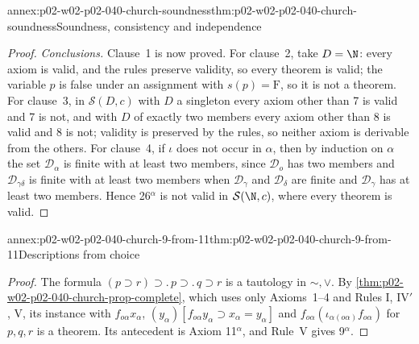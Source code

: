 \begin{annexitem}{annex:p02-w02-p02-040-church-soundness}{thm:p02-w02-p02-040-church-soundness}{Soundness, consistency and independence}
\begin{proof}
\emph{Conclusions.}  Clause~1 is now proved.  For clause~2, take
\(D=\N\): every axiom is valid, and the rules preserve validity, so every
theorem is valid; the variable \(p\) is false under an assignment with
\(s(p)=\mathrm F\), so it is not a theorem.  For clause~3, in
\(\mathcal S(D,c)\) with \(D\) a singleton every axiom other than 7 is valid
and 7 is not, and with \(D\) of exactly two members every axiom other than 8
is valid and 8 is not; validity is preserved by the rules, so neither axiom
is derivable from the others.  For clause~4, if \(\iota\) does not occur in
\(\alpha\), then by induction on \(\alpha\) the set \(\mathcal D_\alpha\) is
finite with at least two members, since \(\mathcal D_o\) has two members and
\(\mathcal D_{\gamma\delta}\) is finite with at least two members when
\(\mathcal D_\gamma\) and \(\mathcal D_\delta\) are finite and
\(\mathcal D_\gamma\) has at least two members.  Hence 26\(^\alpha\) is not
valid in \(\mathcal S(\N,c)\), where every theorem is valid.
\end{proof}
\end{annexitem}

\begin{annexitem}{annex:p02-w02-p02-040-church-9-from-11}{thm:p02-w02-p02-040-church-9-from-11}{Descriptions from choice}
\begin{proof}
The formula \((p\supset r)\supset.\,p\supset.\,q\supset r\) is a tautology in
\(\sim,\vee\).  By \cref{thm:p02-w02-p02-040-church-prop-complete}, which uses
only Axioms~1--4 and Rules I, IV\('\), V, its instance with
\(f_{o\alpha}x_\alpha\), \((y_\alpha)[f_{o\alpha}y_\alpha\supset x_\alpha=y_\alpha]\)
and \(f_{o\alpha}(\iota_{\alpha(o\alpha)}f_{o\alpha})\) for \(p,q,r\) is a theorem.
Its antecedent is Axiom 11\(^\alpha\), and Rule~V gives 9\(^\alpha\).
\end{proof}
\end{annexitem}

